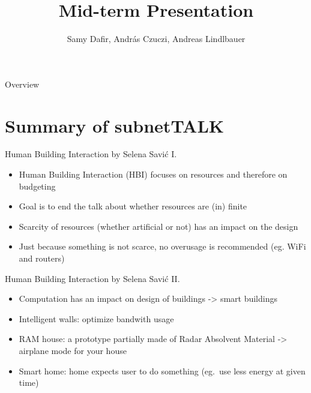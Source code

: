 \documentclass[10pt]{beamer}
\title{Mid-term Presentation}
\author{Samy Dafir, András Czuczi, Andreas Lindlbauer} %
\date{}
\begin{document}
\begin{frame}
	\maketitle 
\end{frame}


\begin{frame}{Overview}
	\tableofcontents
\end{frame}


\section{Summary of subnetTALK}


\begin{frame}{Human Building Interaction by Selena Savić I.} %
	\begin{itemize}
        \pause{}
		\item Human Building Interaction (HBI) focuses on resources and therefore on budgeting
		\pause{}
		\item Goal is to end the talk about whether resources are (in) finite
		\pause{}
		\item Scarcity of resources (whether artificial or not) has an impact on the design
		\pause{}
		\item Just because something is not scarce, no overusage is recommended (eg. WiFi and routers)
	\end{itemize}	
\end{frame}


\begin{frame}{Human Building Interaction by Selena Savić II.} %
	\begin{itemize}
        \pause{}
		\item Computation has an impact on design of buildings -> smart buildings
		\pause{}
		\item Intelligent walls: optimize bandwith usage
		\pause{}
		\item RAM house: a prototype partially made of Radar Absolvent Material -> airplane mode for your house
		\pause{}
		\item Smart home: home expects user to do something (eg.\ use less energy at given time)
	\end{itemize}	
\end{frame}
\end{document}
